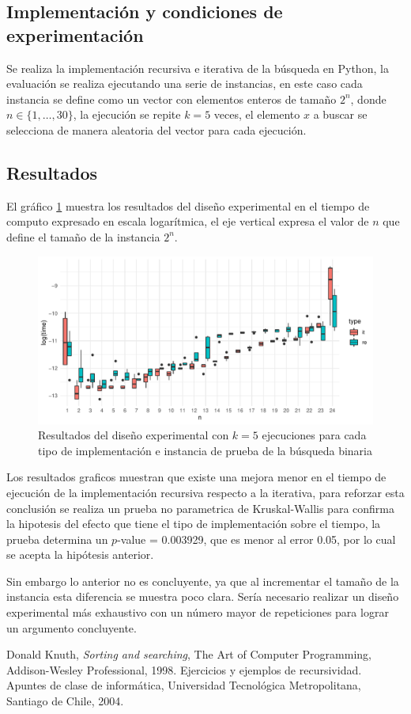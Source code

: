 \documentclass[letterpaper,11pt]{article}
\begin{document}
\subsection{Implementación y condiciones de experimentación}
Se realiza la implementación recursiva e iterativa de la búsqueda en Python, la evaluación se realiza ejecutando una serie de instancias, en este caso cada instancia se define como un vector con elementos enteros de tamaño ${2^n}$, donde $n\in \{1,\dots,30\}$, la ejecución se repite $k=5$ veces, el elemento $x$ a buscar se selecciona de manera aleatoria del vector para cada ejecución.

\subsection{Resultados}
El gráfico \ref{fig:bs} muestra los resultados del diseño experimental en el tiempo de computo expresado en escala logarítmica, el eje vertical expresa el valor de $n$ que define el tamaño de la instancia ${2^n}$.

\begin{figure}[h!]
  \includegraphics[width=\linewidth]{bs.pdf}
  \caption{Resultados del diseño experimental con $k=5$ ejecuciones para cada tipo de implementación e instancia de prueba de la búsqueda binaria}
  \label{fig:bs}
\end{figure}


Los resultados graficos muestran que existe una mejora menor en el tiempo de ejecución de la implementación recursiva respecto a la iterativa, para reforzar esta conclusión se realiza un prueba no parametrica de Kruskal-Wallis para confirma la hipotesis del efecto que tiene el tipo de implementación sobre el tiempo, la prueba determina un $p$-value = 0.003929, que es menor al error 0.05, por lo cual se acepta la hipótesis anterior.

Sin embargo lo anterior no es concluyente, ya que al incrementar el tamaño de la instancia esta diferencia se muestra poco clara. Sería necesario realizar un diseño experimental más exhaustivo con un número mayor de repeticiones para lograr un argumento concluyente.

\begin{thebibliography}{0}
   Donald Knuth, \textit{Sorting and searching}, The Art of Computer Programming, Addison-Wesley Professional, 1998.
   Ejercicios y ejemplos de recursividad. Apuntes de clase de informática, Universidad Tecnológica Metropolitana, Santiago de Chile, 2004.
\end{thebibliography}
\end{document}
